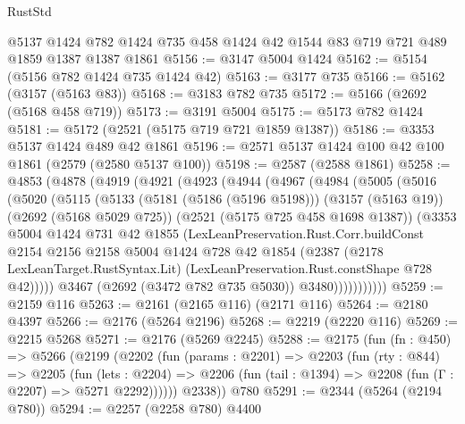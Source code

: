 \begin{lexlean}{RustStd}
\begin{coremodule}
{\begin{coremodule}
{{{{{{{{{{    @5137
    @1424
    @782
    @1424
    @735
    @458
    @1424
    @42
    @1544
    @83
    @719
    @721
    @489
    @1859
    @1387
    @1387
    @1861
@5156 := @3147 @5004 @1424
@5162 := @5154 (@5156 @782 @1424 @735 @1424 @42)
@5163 := @3177 @735
@5166 := @5162 (@3157 (@5163 @83))
@5168 := @3183 @782 @735
@5172 := @5166 (@2692 (@5168 @458 @719))
@5173 := @3191 @5004
@5175 := @5173 @782 @1424
@5181 := @5172 (@2521 (@5175 @719 @721 @1859 @1387))
@5186 := @3353 @5137 @1424 @489 @42 @1861
@5196 := @2571 @5137 @1424 @100 @42 @100 @1861 (@2579 (@2580 @5137 @100))
@5198 := @2587 (@2588 @1861)
@5258 := @4853
    (@4878
      (@4919
        (@4921
          (@4923
            (@4944
              (@4967
                (@4984
                  (@5005
                    (@5016
                      (@5020
                        (@5115
                          (@5133
                            (@5181 (@5186 (@5196 @5198)))
                            (@3157 (@5163 @19))
                            (@2692 (@5168 @5029 @725))
                            (@2521 (@5175 @725 @458 @1698 @1387))
                            (@3353
                              @5004
                              @1424
                              @731
                              @42
                              @1855
                              (LexLeanPreservation.Rust.Corr.buildConst
                                @2154
                                @2156
                                @2158
                                @5004
                                @1424
                                @728
                                @42
                                @1854
                                (@2387
                                  (@2178 LexLeanTarget.RustSyntax.Lit)
                                  (LexLeanPreservation.Rust.constShape @728 @42)))))
                          @3467
                          (@2692 (@3472 @782 @735 @5030))
                          @3480)))))))))))
@5259 := @2159 @116
@5263 := @2161 (@2165 @116) (@2171 @116)
@5264 := @2180 @4397
@5266 := @2176 (@5264 @2196)
@5268 := @2219 (@2220 @116)
@5269 := @2215 @5268
@5271 := @2176 (@5269 @2245)
@5288 := @2175
    (fun (fn : @450) =>
    @5266
      (@2199
        (@2202
          (fun (params : @2201) =>
          @2203
            (fun (rty : @844) =>
            @2205
              (fun (lets : @2204) =>
              @2206 (fun (tail : @1394) => @2208 (fun (Γ : @2207) => @5271 @2292))))))
        @2338))
    @780
@5291 := @2344 (@5264 (@2194 @780))
@5294 := @2257 (@2258 @780) @4400
}}}}}}}}}}
\end{coremodule}}
\end{coremodule}
\end{lexlean}
